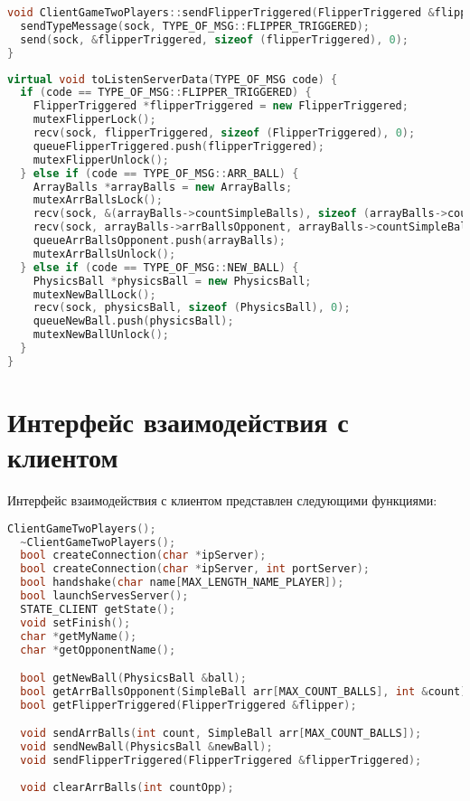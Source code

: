\begin{lstlisting}[language=C++, caption={Отправка информации о рычаге, пружине, счете},label=DescriptiveLabel]
void ClientGameTwoPlayers::sendFlipperTriggered(FlipperTriggered &flipperTriggered) {
  sendTypeMessage(sock, TYPE_OF_MSG::FLIPPER_TRIGGERED);
  send(sock, &flipperTriggered, sizeof (flipperTriggered), 0);
}
\end{lstlisting}

\begin{lstlisting}[language=C++, caption={Получение данных типа Т},label=DescriptiveLabel]
virtual void toListenServerData(TYPE_OF_MSG code) {
  if (code == TYPE_OF_MSG::FLIPPER_TRIGGERED) {
    FlipperTriggered *flipperTriggered = new FlipperTriggered;
    mutexFlipperLock();
    recv(sock, flipperTriggered, sizeof (FlipperTriggered), 0);
    queueFlipperTriggered.push(flipperTriggered);
    mutexFlipperUnlock();
  } else if (code == TYPE_OF_MSG::ARR_BALL) {
    ArrayBalls *arrayBalls = new ArrayBalls;
    mutexArrBallsLock();
    recv(sock, &(arrayBalls->countSimpleBalls), sizeof (arrayBalls->countSimpleBalls), 0);
    recv(sock, arrayBalls->arrBallsOpponent, arrayBalls->countSimpleBalls * sizeof (SimpleBall), 0);
    queueArrBallsOpponent.push(arrayBalls);
    mutexArrBallsUnlock();
  } else if (code == TYPE_OF_MSG::NEW_BALL) {
    PhysicsBall *physicsBall = new PhysicsBall;
    mutexNewBallLock();
    recv(sock, physicsBall, sizeof (PhysicsBall), 0);
    queueNewBall.push(physicsBall);
    mutexNewBallUnlock();
  } 
}
\end{lstlisting}

\section{Интерфейс взаимодействия с клиентом}

Интерфейс взаимодействия с клиентом представлен следующими функциями:
\begin{lstlisting}[language=C++, caption={Интерфейс взаимодействия с клиентом},label=DescriptiveLabel]
  ClientGameTwoPlayers();
  ~ClientGameTwoPlayers();
  bool createConnection(char *ipServer);
  bool createConnection(char *ipServer, int portServer);
  bool handshake(char name[MAX_LENGTH_NAME_PLAYER]);
  bool launchServesServer();
  STATE_CLIENT getState();
  void setFinish();
  char *getMyName();
  char *getOpponentName();

  bool getNewBall(PhysicsBall &ball);
  bool getArrBallsOpponent(SimpleBall arr[MAX_COUNT_BALLS], int &count);
  bool getFlipperTriggered(FlipperTriggered &flipper);

  void sendArrBalls(int count, SimpleBall arr[MAX_COUNT_BALLS]);
  void sendNewBall(PhysicsBall &newBall);
  void sendFlipperTriggered(FlipperTriggered &flipperTriggered);
  
  void clearArrBalls(int countOpp);
\end{lstlisting}

